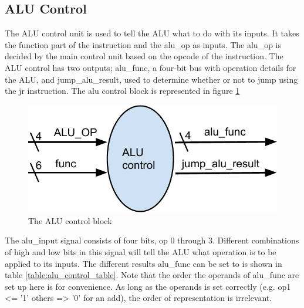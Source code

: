 \subsection{ALU Control}

The ALU control unit is used to tell the ALU what to do with its inputs. It takes the function part of the instruction and the alu\_op as inputs. The alu\_op is decided by the main control unit based on the opcode of the instruction. The ALU control has two outputs; alu\_func, a four-bit bus with operation details for the ALU, and jump\_alu\_result, used to determine whether or not to jump using the jr instruction. The alu control block is represented in figure \ref {fig:alu_control}
\begin{figure}
	\label{fig:alu_control}
	\includegraphics{figures/alu_control}
	\caption{The ALU control block}
\end{figure}

The alu\_input signal consists of four bits, op 0 through 3. Different combinations of high and low bits in this signal will tell the ALU what operation is to be applied to its inputs.  The different results alu\_func can be set to is shown in table \ref{table:alu_control_table}. Note that the order the operands of alu\_func are set up here is for convenience. As long as the operands is set correctly (e.g. op1 <= '1' others => '0' for an add), the order of representation is irrelevant. 

